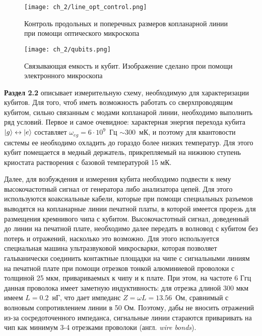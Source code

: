 \begin{figure}[htb]\center
	\texttt{[image: ch\_2/line\_opt\_control.png]} \hfill
	\caption[width=0.6\textwidth]{Контроль продольных и поперечных размеров копланарной линии при помощи оптического микроскопа}
	\label{fig: line}
\end{figure}

\begin{figure}[htb]\center
	\texttt{[image: ch\_2/qubits.png]} \hfill
	\caption[width=0.6\textwidth]{Связывающая емкость и кубит. Изображение сделано прои помощи электронного микроскопа}
	\label{fig: qubits}
\end{figure}
\textbf{Раздел 2.2} описывает измерительную схему, необходимую для характеризации кубитов. Для того, чтоб иметь возможность работать со сверхпроводящим кубитом, сильно связанным с модами копланарой линии, необходимо выполнить ряд условий.
Первое и самое очевидное: характерная энергия перехода кубита $\ket{g} \leftrightarrow \ket{e}$ составляет $\omega_{eg}=6\cdot 10^{9}$~Гц $\sim 300$~мК, и поэтому для квантовости системы ее необходимо охладить до гораздо более низких температур. Для этого кубит помещается в медный держатель, прикрепляемый на нижнюю ступень криостата растворения с базовой температурой 15 мК.

Далее, для возбуждения и измерения кубита необходимо подвести к нему высокочастотный сигнал от генератора либо анализатора цепей. Для этого используются коаксиальные кабели, которые при помощи специальных разъемов выводятся на копланарные линии печатной платы, в которой имеется прорезь для размещения кремнивого чипа с кубитом. Высокочастотный сигнал, доведенный до линии на печатной плате, необходимо далее передать в волновод с кубитом без потерь и отражений, насколько это возможно. Для этого используется специальная машина ультразвуковой микросварки, которая позволяет гальванически соединить контактные площадки на чипе с сигнальными линиям на печатной плате при помощи отрезков тонкой алюминиевой проволоки с толщиной 25 мкм, привариваемых к чипу и к плате. При этом, на частоте 6 Ггц данная проволока имеет заметную индуктивность: для отрезка длиной 300 мкм имеем $L=0.2$~нГ, что дает импеданс $Z = \omega L= 13.56$~Ом, сравнимый с волновым сопротивлением линии в 50 Ом. Поэтому, дабы не вносить отражений из-за сосредоточенного импеданса, сигнальные линии стараются приваривать на чип как минимум 3-4 отрезками проволоки (англ. \textit{wire bonds}).

